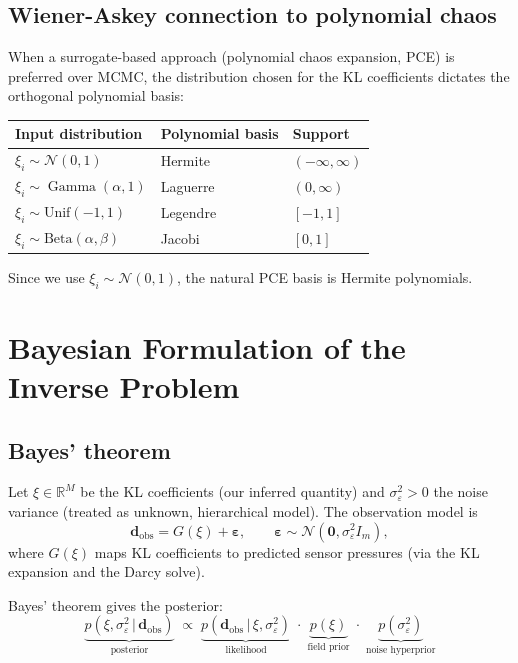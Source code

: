 \documentclass[11pt, a4paper]{article}
\newcommand{\R}{\mathbb{R}}
\newcommand{\N}{\mathcal{N}}
\newcommand{\Ga}{\operatorname{Gamma}}
\theoremstyle{definition}
\begin{document}
\subsection{Wiener-Askey connection to polynomial chaos}

When a surrogate-based approach (polynomial chaos expansion, PCE) is
preferred over MCMC, the distribution chosen for the KL coefficients
dictates the orthogonal polynomial basis:
\begin{center}
\begin{tabular}{lll}
\toprule
Input distribution & Polynomial basis & Support \\
\midrule
$\xi_i\sim\N(0,1)$       & Hermite   & $(-\infty,\infty)$ \\
$\xi_i\sim\Ga(\alpha,1)$ & Laguerre  & $(0,\infty)$ \\
$\xi_i\sim\mathrm{Unif}(-1,1)$ & Legendre & $[-1,1]$ \\
$\xi_i\sim\mathrm{Beta}(\alpha,\beta)$ & Jacobi & $[0,1]$ \\
\bottomrule
\end{tabular}
\end{center}
Since we use $\xi_i\sim\N(0,1)$, the natural PCE basis is Hermite
polynomials.

\section{Bayesian Formulation of the Inverse Problem}

\subsection{Bayes' theorem}

Let $\xi\in\R^M$ be the KL coefficients (our inferred quantity) and
$\sigma_\varepsilon^2>0$ the noise variance (treated as unknown,
hierarchical model).  The observation model is
\begin{equation}
  \mathbf{d}_{\mathrm{obs}} = G(\xi) + \boldsymbol{\varepsilon},
  \qquad
  \boldsymbol{\varepsilon}\sim\N(\mathbf{0},\sigma_\varepsilon^2 I_m),
  \label{eq:obs_model}
\end{equation}
where $G(\xi)$ maps KL coefficients to predicted sensor pressures
(via the KL expansion and the Darcy solve).

Bayes' theorem gives the posterior:
\begin{equation}
  \underbrace{p(\xi,\sigma_\varepsilon^2\,|\,\mathbf{d}_{\mathrm{obs}})}_{\text{posterior}}
  \;\propto\;
  \underbrace{p(\mathbf{d}_{\mathrm{obs}}\,|\,\xi,\sigma_\varepsilon^2)}_{\text{likelihood}}
  \;\cdot\;
  \underbrace{p(\xi)}_{\text{field prior}}
  \;\cdot\;
  \underbrace{p(\sigma_\varepsilon^2)}_{\text{noise hyperprior}}
  \label{eq:bayes}
\end{equation}
\end{document}

